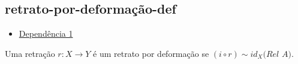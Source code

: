 \subsection{retrato-por-deformação-def}
\label{retrato-por-deformação-def}

\begin{itemize}{Lista de Dependências}
    \item \hyperref[retração-def]{Dependência 1}
\end{itemize}

\begin{defi}

Uma retração $r:X \rightarrow Y$ é um retrato por deformação se $(i\circ r) \sim id_X \textit{(Rel A)}$.

\end{defi}
